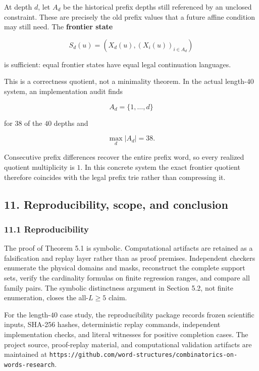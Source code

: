 \documentclass[
  british,
  a4paper,
  11pt]{article}
\begin{document}
At depth \(d\), let \(A_d\) be the historical prefix depths still
referenced by an unclosed constraint. These are precisely the old prefix
values that a future affine condition may still need. The
\textbf{frontier state}

\[
S_d(u)
=
\left(
X_d(u),(X_i(u))_{i\in A_d}
\right)
\tag{10.6}
\]

is sufficient: equal frontier states have equal legal continuation
languages.

This is a correctness quotient, not a minimality theorem. In the actual
length-\(40\) system, an implementation audit finds

\[
A_d=\{1,\ldots,d\}
\]

for \(38\) of the \(40\) depths and

\[
\max_d|A_d|=38.
\]

Consecutive prefix differences recover the entire prefix word, so every
realized quotient multiplicity is \(1\). In this concrete system the
exact frontier quotient therefore coincides with the legal prefix trie
rather than compressing it.

\subsection{11. Reproducibility, scope, and
conclusion}\label{reproducibility-scope-and-conclusion}

\subsubsection{11.1 Reproducibility}\label{reproducibility}

The proof of Theorem 5.1 is symbolic. Computational artifacts are
retained as a falsification and replay layer rather than as proof
premises. Independent checkers enumerate the physical domains and masks,
reconstruct the complete support sets, verify the cardinality formulas
on finite regression ranges, and compare all family pairs. The symbolic
distinctness argument in Section 5.2, not finite enumeration, closes the
all-\(L\ge5\) claim.

For the length-\(40\) case study, the reproducibility package records
frozen scientific inputs, SHA-256 hashes, deterministic replay commands,
independent implementation checks, and literal witnesses for positive
completion cases. The project source, proof-replay material, and
computational validation artifacts are maintained at
\texttt{https://github.com/word-structures/combinatorics-on-words-research}.
\end{document}
